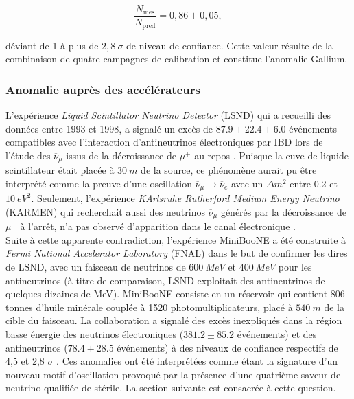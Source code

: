 \begin{equation}
    \frac{N_\textrm{mes}}{N_\textrm{pred}} = 0,86 \pm 0,05,
\end{equation}

\bigbreak

déviant de 1 à plus de $2,8\ \sigma$ de niveau de confiance. Cette valeur résulte de la combinaison de quatre campagnes de calibration et constitue l'anomalie Gallium.

\bigbreak

\subsubsection*{Anomalie auprès des accélérateurs}

L'expérience \textit{Liquid Scintillator Neutrino Detector} (LSND) qui a recueilli des données entre 1993 et 1998, a signalé un excès de $87.9 \pm 22.4 \pm 6.0$ événements compatibles avec l'interaction d'antineutrinos électroniques par IBD lors de l'étude des $\overline{\nu}_\mu$ issus de la décroissance de $\mu^+$ au repos \cite{Aguilar:2001ty}. Puisque la cuve de liquide scintillateur était placée à $\SI{30}{m}$ de la source, ce phénomène aurait pu être interprété comme la preuve d'une oscillation $\overline{\nu}_\mu \rightarrow \overline{\nu}_e$ avec un $\Delta m^2$ entre 0.2 et $\SI{10}{eV^2}$. Seulement, l'expérience \textit{KArlsruhe Rutherford Medium Energy Neutrino} (KARMEN) qui recherchait aussi des neutrinos $\overline{\nu}_\mu$ générés par la décroissance de $\mu^+$ à l'arrêt, n'a pas observé d'apparition dans le canal électronique \cite{Armbruster:2002mp}.\\

Suite à cette apparente contradiction, l'expérience MiniBooNE a été construite à \textit{Fermi National Accelerator Laboratory} (FNAL) dans le but de confirmer les dires de LSND, avec un faisceau de neutrinos de $\SI{600}{MeV}$ et $\SI{400}{MeV}$ pour les antineutrinos (à titre de comparaison, LSND exploitait des antineutrinos de quelques dizaines de MeV). MiniBooNE consiste en un réservoir qui contient 806 tonnes d'huile minérale couplée à 1520 photomultiplicateurs, placé à $\SI{540}{m}$ de la cible du faisceau. La collaboration a signalé des excès inexpliqués dans la région basse énergie des neutrinos électroniques ($381.2 \pm 85.2$ événements) et des antineutrinos ($78.4 \pm 28.5$ événements) à des niveaux de confiance respectifs de 4,5 et 2,8 $\sigma$ \cite{Aguilar-Arevalo:2018gpe}. Ces anomalies ont été interprétées comme étant la signature d'un nouveau motif d'oscillation provoqué par la présence d'une quatrième saveur de neutrino qualifiée de stérile. La section suivante est consacrée à cette question.\\

